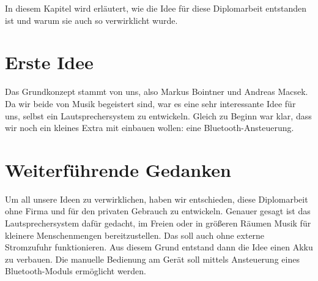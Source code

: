 In diesem Kapitel wird erläutert, wie die Idee für diese Diplomarbeit entstanden ist und warum sie auch so verwirklicht wurde.

\section{Erste Idee} \label{sec:1.1}
Das Grundkonzept stammt von uns, also Markus Bointner und Andreas Macsek. Da wir beide von Musik begeistert sind, war es eine sehr interessante Idee für uns, selbst ein Lautsprechersystem zu entwickeln. Gleich zu Beginn war klar, dass wir noch ein kleines Extra mit einbauen wollen: eine Bluetooth-Ansteuerung.

\section{Weiterführende Gedanken} \label{sec:1.2}
Um all unsere Ideen zu verwirklichen, haben wir entschieden, diese Diplomarbeit ohne Firma und für den privaten Gebrauch zu entwickeln. Genauer gesagt ist das Lautsprechersystem dafür gedacht, im Freien oder in größeren Räumen Musik für kleinere Menschenmengen bereitzustellen. Das soll auch ohne externe Stromzufuhr funktionieren. Aus diesem Grund entstand dann die Idee einen Akku zu verbauen. Die manuelle Bedienung am Gerät soll mittels Ansteuerung eines Bluetooth-Moduls ermöglicht werden.
